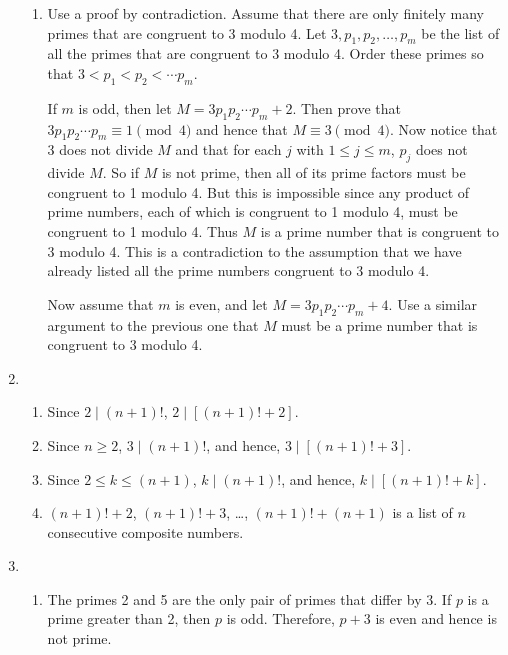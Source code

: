 \begin{enumerate}
\begin{enumerate}
\item Use a proof by contradiction.  Assume that there are only finitely many primes that are congruent to 3 modulo 4.  Let $3, p_1, p_2, \ldots, p_m$ be the list of all the primes that are congruent to 3 modulo 4.  Order these primes so that $3 < p_1 < p_2 < \cdots p_m$.

If $m$ is odd, then let $M = 3 p_1 p_2 \cdots p_m + 2$.  Then prove that 
$3 p_1 p_2 \cdots p_m \equiv 1 \pmod 4$ and hence that $M \equiv 3 \pmod 4$.  Now notice that 3 does not divide $M$ and that for each $j$ with $1 \leq j \leq m$, $p_j$ does not divide 
$M$.  So if $M$ is not prime, then all of its prime factors must be congruent to 1 modulo 4.  But this is impossible since any product of prime numbers, each of which is congruent to 1 modulo 4, must be congruent to 1 modulo 4.  Thus $M$ is a prime number that is congruent to 3 modulo 4.  This is a contradiction to the assumption that we have already listed all the prime numbers congruent to 3 modulo 4.

Now assume that $m$ is even, and let $M =3 p_1 p_2 \cdots p_m + 4$.  Use a similar argument to the previous one that $M$ must be a prime number that is congruent to 3 modulo 4.
\end{enumerate}

\item \begin{enumerate}
\item Since $2 \mid \left( n + 1 \right)!$, $2 \mid \left[\left( n + 1 \right)! + 2 \right]$.

\item Since $n \geq 2$, $3 \mid \left( n + 1 \right)!$, and hence, 
$3 \mid \left[\left( n + 1 \right)! + 3 \right]$.

\item Since $2 \leq k \leq \left( n + 1 \right)$, $k \mid \left( n + 1 \right)!$, and hence, 
$k \mid \left[\left( n + 1 \right)! + k \right]$.

\item $\left( n + 1 \right)! + 2$, $\left( n + 1 \right)! + 3$, \ldots,  
$\left( n + 1 \right)! + \left( n + 1 \right)$ is a list of $n$ consecutive composite numbers.
\end{enumerate}

\item \begin{enumerate}
\item The primes 2 and 5 are the only pair of primes that differ by 3.  If $p$ is a prime greater than 2, then $p$ is odd.  Therefore, $p + 3$ is even and hence is not prime.


\end{enumerate}
\end{enumerate}
